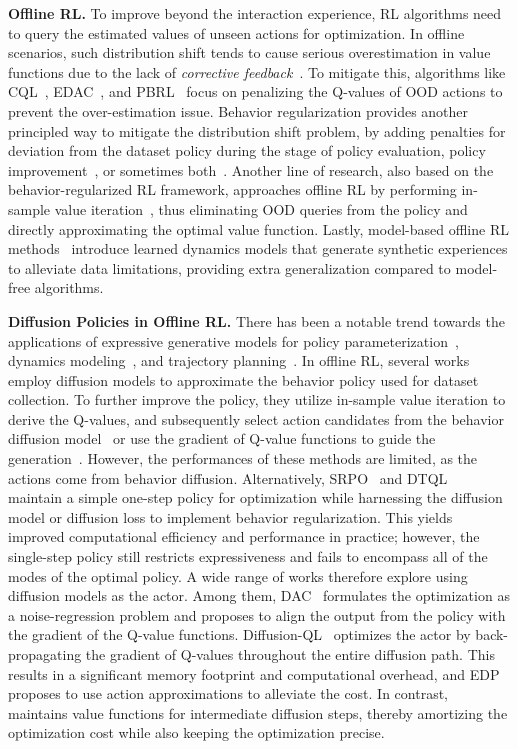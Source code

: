 \textbf{Offline RL. }
To improve beyond the interaction experience, RL algorithms need to query the estimated values of unseen actions for optimization. In offline scenarios, such distribution shift tends to cause serious overestimation in value functions due to the lack of \textit{corrective feedback}~\citep{discor}. To mitigate this, algorithms like CQL~\citep{cql}, EDAC~\citep{EDAC}, and PBRL~\citep{pbrl} focus on penalizing the Q-values of OOD actions to prevent the over-estimation issue. Behavior regularization provides another principled way to mitigate the distribution shift problem, by adding penalties for deviation from the dataset policy during the stage of policy evaluation, policy improvement~\cite{bcq,td3bc,prdc}, or sometimes both~\citep{brac,rebrac}. Another line of research, also based on the behavior-regularized RL framework, approaches offline RL by performing in-sample value iteration~\citep{iql,xql,ivr}, thus eliminating OOD queries from the policy and directly approximating the optimal value function. Lastly, model-based offline RL methods~\citep{mopo,mobile,morec} introduce learned dynamics models that generate synthetic experiences to alleviate data limitations, providing extra generalization compared to model-free algorithms. 

\textbf{Diffusion Policies in Offline RL. }There has been a notable trend towards the applications of expressive generative models for policy parameterization~\citep{diffuser}, dynamics modeling~\citep{twm,dwm}, and trajectory planning~\citep{dt,dd,act}. In offline RL, several works employ diffusion models to approximate the behavior policy used for dataset collection. To further improve the policy, they utilize in-sample value iteration to derive the Q-values, and subsequently select action candidates from the behavior diffusion model~\citep{idql,sfbc} or use the gradient of Q-value functions to guide the generation~\citep{qgpo,diffusiondice}. However, the performances of these methods are limited, as the actions come from behavior diffusion. Alternatively, SRPO~\citep{srpo} and DTQL~\citep{dtql} maintain a simple one-step policy for optimization while harnessing the diffusion model or diffusion loss to implement behavior regularization. This yields improved computational efficiency and performance in practice; however, the single-step policy still restricts expressiveness and fails to encompass all of the modes of the optimal policy. A wide range of works therefore explore using diffusion models as the actor. Among them, DAC~\citep{dac} formulates the optimization as a noise-regression problem and proposes to align the output from the policy with the gradient of the Q-value functions. Diffusion-QL~\citep{dql} optimizes the actor by back-propagating the gradient of Q-values throughout the entire diffusion path. This results in a significant memory footprint and computational overhead, and EDP~\citep{edp} proposes to use action approximations to alleviate the cost. In contrast, \algbb maintains value functions for intermediate diffusion steps, thereby amortizing the optimization cost while also keeping the optimization precise. 